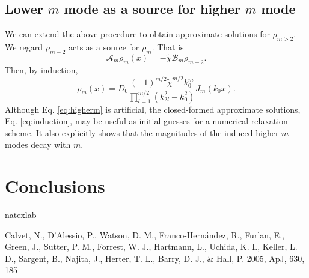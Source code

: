 \documentclass[apj]{emulateapj}
\newcommand{\beq}{\begin{equation}}
\newcommand{\eeq}{\end{equation}}
\begin{document}
\subsection{Lower $m$ mode as a source for higher $m$ mode}
We can extend the above procedure to obtain approximate solutions for
$\rho_{m>2}$. We regard $\rho_{m-2}$ acts as a source for $\rho_{m}$. That is
\beq\label{eq:higherm}
\mathcal{A}_m\rho_m(x) = -\tilde{\chi}\mathcal{B}_m\rho_{m-2}. 
\eeq 
Then, by induction,
\beq\label{eq:induction}
\rho_m(x) =D_0
\frac{(-1)^{m/2}\tilde{\chi}^{m/2}k_0^m}{\prod_{l=1}^{m/2}(k_{2l}^2-k_0^2)}J_m(k_0x). 
\eeq
Although Eq. \ref{eq:higherm} is artificial, the closed-formed
approximate solutions, Eq. \ref{eq:induction}, may be useful as initial
guesses for a numerical relaxation scheme. It also explicitly shows that the
magnitudes of the induced higher $m$ modes decay with $m$.  



\section{Conclusions}

\acknowledgments

\begin{thebibliography}{}
\expandafter\ifx\csname natexlab\endcsname\relax\def\natexlab#1{#1}\fi

 Calvet, N., D'Alessio, P.,
  Watson, D. M., Franco-Hernández, R., Furlan, E., Green, J., Sutter,
  P. M., Forrest, W. J., Hartmann, L., Uchida, K. I., Keller, L. D.,
  Sargent, B., Najita, J., Herter, T. L., Barry, D. J., \& Hall,
  P. 2005, ApJ, 630, 185



\end{thebibliography}
\end{document}
